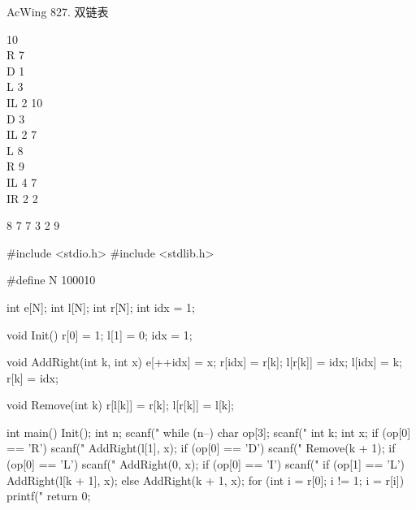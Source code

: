 \begin{titledbox}{AcWing 827. 双链表}
    \begin{inputblock}
        10 \\
        R 7 \\
        D 1 \\
        L 3 \\
        IL 2 10 \\
        D 3 \\
        IL 2 7 \\
        L 8 \\
        R 9 \\
        IL 4 7 \\
        IR 2 2
    \end{inputblock}
    \begin{outputblock}
        8 7 7 3 2 9
    \end{outputblock}
\end{titledbox}

\begin{mycpptwocol}[双链表]
    #include <stdio.h>
    #include <stdlib.h>

    #define N 100010

    int e[N];
    int l[N];
    int r[N];
    int idx = 1;

    void Init() {
        r[0] = 1;
        l[1] = 0;
        idx = 1;
    }

    void AddRight(int k, int x) {
        e[++idx] = x;
        r[idx] = r[k];
        l[r[k]] = idx;
        l[idx] = k;
        r[k] = idx;
    }

    void Remove(int k) {
        r[l[k]] = r[k];
        l[r[k]] = l[k];
    }

    int main() {
        Init();
        int n;
        scanf("%
        while (n--) {
            char op[3];
            scanf("%
            int k;
            int x;
            if (op[0] == 'R') {
                scanf("%
                AddRight(l[1], x);
            }
            if (op[0] == 'D') {
                scanf("%
                Remove(k + 1);
            }
            if (op[0] == 'L') {
                scanf("%
                AddRight(0, x);
            }
            if (op[0] == 'I') {
                scanf("%
                if (op[1] == 'L') {
                    AddRight(l[k + 1], x);
                } else {
                    AddRight(k + 1, x);
                }
            }
        }
        for (int i = r[0]; i != 1; i = r[i]) {
            printf("%
        }
        return 0;
    }
\end{mycpptwocol}


